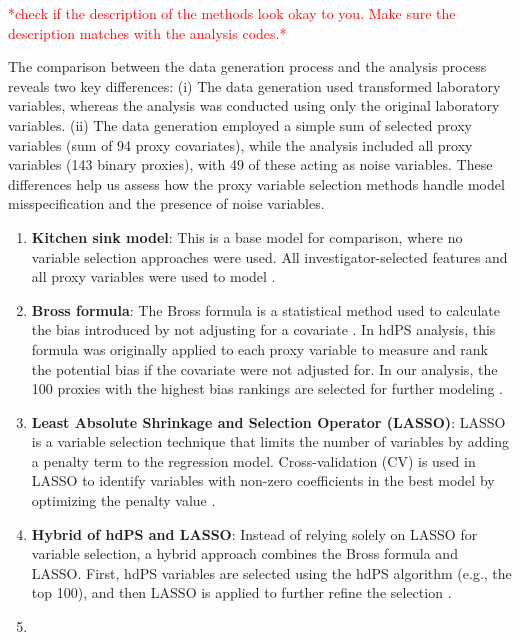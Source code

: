 \documentclass[sn-vancouver,Numbered,lineno,pdflatex]{sn-jnl}
\begin{document}
\textcolor{red}{*check if the description of the methods look okay to you. Make sure the description matches with the analysis codes.*}

The comparison between the data generation process and the analysis
process reveals two key differences: (i) The data generation used
transformed laboratory variables, whereas the analysis was conducted
using only the original laboratory variables. (ii) The data generation
employed a simple sum of selected proxy variables (sum of 94 proxy
covariates), while the analysis included all proxy variables (143 binary
proxies), with 49 of these acting as noise variables. These differences
help us assess how the proxy variable selection methods handle model
misspecification and the presence of noise variables.

\begin{enumerate}
\def\labelenumi{\arabic{enumi}.}
\item
  \textbf{Kitchen sink model}: This is a base model for comparison,
  where no variable selection approaches were used. All
  investigator-selected features and all proxy variables were used to
  model \citep{karim2018can}.
\item
  \textbf{Bross formula}: The Bross formula is a statistical method used
  to calculate the bias introduced by not adjusting for a covariate
  \citep{bross1966spurious}. In hdPS analysis, this formula was
  originally applied to each proxy variable to measure and rank the
  potential bias if the covariate were not adjusted for. In our
  analysis, the 100 proxies with the highest bias rankings are selected
  for further modeling \citep{schneeweiss2009high, wyss2018erratum}.
\item
  \textbf{Least Absolute Shrinkage and Selection Operator (LASSO)}:
  LASSO is a variable selection technique that limits the number of
  variables by adding a penalty term to the regression model.
  Cross-validation (CV) is used in LASSO to identify variables with
  non-zero coefficients in the best model by optimizing the penalty
  value
  \citep{franklin2015regularized, schneeweiss2017variable, karim2018can}.
\item
  \textbf{Hybrid of hdPS and LASSO}: Instead of relying solely on LASSO
  for variable selection, a hybrid approach combines the Bross formula
  and LASSO. First, hdPS variables are selected using the hdPS algorithm
  (e.g., the top 100), and then LASSO is applied to further refine the
  selection \citep{karim2018can, franklin2015regularized}.
\item

\end{enumerate}
\end{document}
